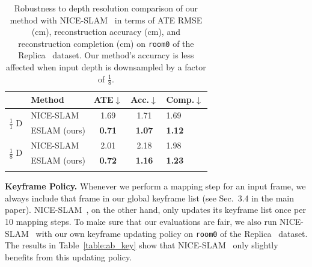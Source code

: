 \begin{table}[t]
    \begin{center}
        \begin{tabular}{l|l|ccl}
            \Xhline{2\arrayrulewidth}
            & \small Method & \small ATE$\downarrow$ & \small Acc.$\downarrow$ & \small Comp.$\downarrow$ \\
            
            \hline
            \multirow{2}{*}{\small $\frac{1}{1}$ D}
            & \small NICE-SLAM~\cite{zhu2022nice} & 1.69 & 1.71 & 1.69 \\
            & \small ESLAM (ours) & \textbf{0.71} & \textbf{1.07} & \textbf{1.12} \\

            \hline
            \multirow{2}{*}{\small $\frac{1}{8}$ D} & \small NICE-SLAM~\cite{zhu2022nice} & 2.01 & 2.18 & 1.98 \\
            & \small ESLAM (ours) & \textbf{0.72} & \textbf{1.16} & \textbf{1.23} \\
            
            \Xhline{2\arrayrulewidth}
        \end{tabular}
    \end{center}
    \caption{Robustness to depth resolution comparison of our method with NICE-SLAM~\cite{zhu2022nice} in terms of ATE RMSE (cm), reconstruction accuracy (cm), and reconstruction completion (cm) on \texttt{room0} of the Replica~\cite{replica19arxiv} dataset. Our method's accuracy is less affected when input depth is downsampled by a factor of $\frac{1}{8}$.}
    \label{table:ab_depth}
\end{table}

\vspace{1ex}
\noindent\textbf{Keyframe Policy.} Whenever we perform a mapping step for an input frame, we always include that frame in our global keyframe list (see Sec.~3.4 in the main paper). NICE-SLAM~\cite{zhu2022nice}, on the other hand, only updates its keyframe list once per 10 mapping steps. To make sure that our evaluations are fair, we also run NICE-SLAM~\cite{zhu2022nice} with our own keyframe updating policy on \texttt{room0} of the Replica~\cite{replica19arxiv} dataset. The results in Table~\ref{table:ab_key} show that NICE-SLAM~\cite{zhu2022nice} only slightly benefits from this updating policy.

